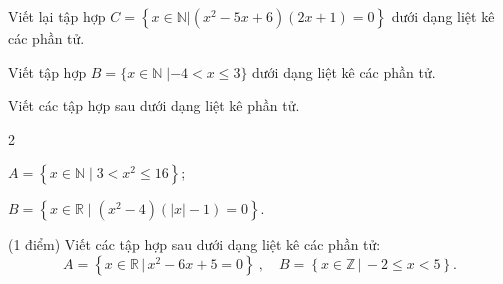 \begin{bt}%
	Viết lại tập hợp $C=\left\{x \in \mathbb{N}  \Big| \left(x^2-5x+6\right)\left(2x+1\right)=0 \right\}$ dưới dạng liệt kê các phần tử.
\end{bt}

\begin{bt}%
Viết tập hợp $B= \lbrace x \in \mathbb{N} \; | -4 <x \le 3 \rbrace$ dưới dạng liệt kê các phần tử.
\end{bt}

\begin{bt}%
	Viết các tập hợp sau dưới dạng liệt kê phần tử.
	\begin{enumEX}{2}
		\item $A=\left\{x\in \mathbb{N}\mid 3<x^2\le 16\right\}$;
		\item $B=\left\{x\in \mathbb{R}\mid(x^2-4)(|x|-1)=0\right\}$.
	\end{enumEX}
\end{bt}

\begin{bt}%
	(1 điểm) Viết các tập hợp sau dưới dạng liệt kê các phần tử:
	$$A=\left\{x\in\mathbb{R} \,\big|\, x^2-6x+5=0\right\}\ , \quad B=\left\{x\in\mathbb{Z} \,\big|\, -2\le x<5\right\}.$$
\end{bt}

